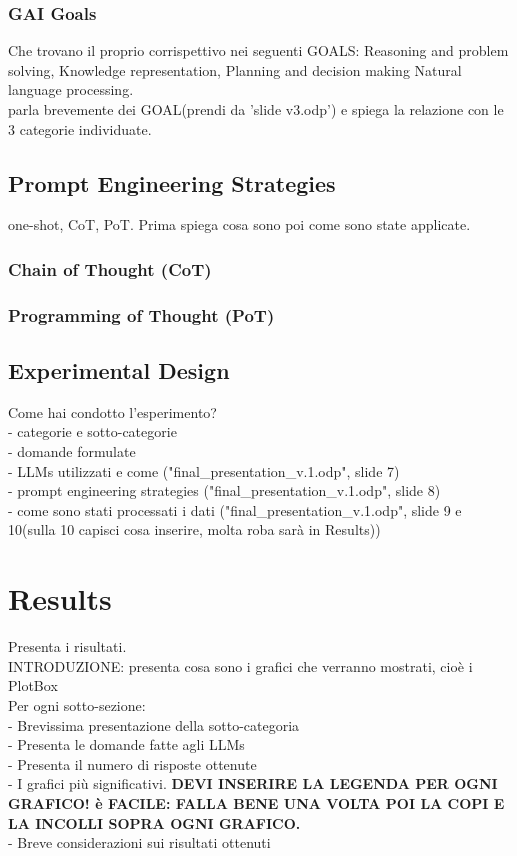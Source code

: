 \documentclass[12pt]{article}
\begin{document}
    \subsubsection{GAI Goals}
    Che trovano il proprio corrispettivo nei seguenti GOALS: Reasoning and problem solving, Knowledge representation, Planning and decision making Natural language processing.\\
    parla brevemente dei GOAL(prendi da 'slide v3.odp') e spiega la relazione con le 3 categorie individuate.
    
    \subsection{Prompt Engineering Strategies}
    one-shot, CoT, PoT. Prima spiega cosa sono poi come sono state applicate.
    \subsubsection{Chain of Thought (CoT)}
    \subsubsection{Programming of Thought (PoT)}
    
    \subsection{Experimental Design}
    Come hai condotto l'esperimento?\\
    - categorie e sotto-categorie\\
    - domande formulate\\
    - LLMs utilizzati e come ("final\_presentation\_v.1.odp", slide 7)\\
    - prompt engineering strategies ("final\_presentation\_v.1.odp", slide 8)\\
    - come sono stati processati i dati ("final\_presentation\_v.1.odp", slide 9 e 10(sulla 10 capisci cosa inserire, molta roba sarà in Results))\\
        
\clearpage
\section{Results}
Presenta i risultati. \\
INTRODUZIONE: presenta cosa sono i grafici che verranno mostrati, cioè i PlotBox\\
Per ogni sotto-sezione:\\
- Brevissima presentazione della sotto-categoria\\
- Presenta le domande fatte agli LLMs\\
- Presenta il numero di risposte ottenute\\
- I grafici più significativi. \textbf{DEVI INSERIRE LA LEGENDA PER OGNI GRAFICO! è FACILE: FALLA BENE UNA VOLTA POI LA COPI E LA INCOLLI SOPRA OGNI GRAFICO.}\\
- Breve considerazioni sui risultati ottenuti\\
\end{document}
